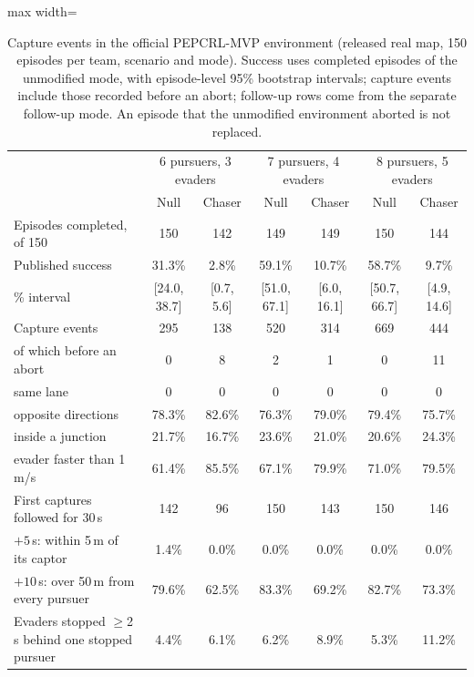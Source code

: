 \documentclass[preprint,12pt]{elsarticle}
\begin{document}
\begin{table}[!h]
\centering
\caption{Capture events in the official PEPCRL-MVP environment (released real map, 150 episodes per team, scenario
and mode). Success uses completed episodes of the unmodified mode, with episode-level 95\% bootstrap intervals;
capture events include those recorded before an abort; follow-up rows come from the separate follow-up mode. An
episode that the unmodified environment aborted is not replaced.}
\label{tab:s-pepcrl}
\small
\setlength{\tabcolsep}{3pt}
\begin{adjustbox}{max width=\textwidth}
\begin{tabular}{@{}lcccccc@{}}
\toprule
& \multicolumn{2}{c}{6 pursuers, 3 evaders} & \multicolumn{2}{c}{7 pursuers, 4 evaders} & \multicolumn{2}{c}{8 pursuers, 5 evaders} \\
& Null & Chaser & Null & Chaser & Null & Chaser \\
\midrule
Episodes completed, of 150 & 150 & 142 & 149 & 149 & 150 & 144 \\
Published success & 31.3\% & 2.8\% & 59.1\% & 10.7\% & 58.7\% & 9.7\% \\
\quad 95\% interval & [24.0, 38.7] & [0.7, 5.6] & [51.0, 67.1] & [6.0, 16.1] & [50.7, 66.7] & [4.9, 14.6] \\
Capture events & 295 & 138 & 520 & 314 & 669 & 444 \\
\quad of which before an abort & 0 & 8 & 2 & 1 & 0 & 11 \\
\quad same lane & 0 & 0 & 0 & 0 & 0 & 0 \\
\quad opposite directions & 78.3\% & 82.6\% & 76.3\% & 79.0\% & 79.4\% & 75.7\% \\
\quad inside a junction & 21.7\% & 16.7\% & 23.6\% & 21.0\% & 20.6\% & 24.3\% \\
\quad evader faster than 1\,m/s & 61.4\% & 85.5\% & 67.1\% & 79.9\% & 71.0\% & 79.5\% \\
\midrule
First captures followed for 30\,s & 142 & 96 & 150 & 143 & 150 & 146 \\
\quad $+5$\,s: within 5\,m of its captor & 1.4\% & 0.0\% & 0.0\% & 0.0\% & 0.0\% & 0.0\% \\
\quad $+10$\,s: over 50\,m from every pursuer & 79.6\% & 62.5\% & 83.3\% & 69.2\% & 82.7\% & 73.3\% \\
Evaders stopped $\ge$2\,s behind one stopped pursuer & 4.4\% & 6.1\% & 6.2\% & 8.9\% & 5.3\% & 11.2\% \\
\bottomrule
\end{tabular}
\end{adjustbox}
\end{table}
\end{document}

